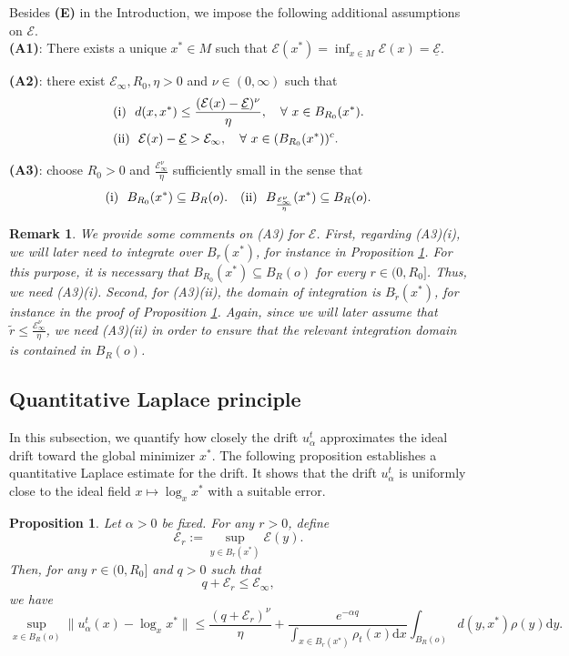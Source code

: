 \documentclass[11pt]{amsart}
\newtheorem{proposition}{Proposition}[section]
\newtheorem{remark}{Remark}[section]
\def\d{\mathrm{d}}
\newcommand{\supp}{\mathrm{supp}(\rho)}
\newcommand{\p}{o}%
\begin{document}
Besides \textbf{(E)} in the Introduction, we impose the following additional assumptions on $\mathcal{E}$.\\

\noindent\textbf{(A1)}: There exists a unique $x^*\in M$ such that $\mathcal E(x^*) = \inf_{x\in M} \mathcal E(x) =\underline{\mathcal E}$.


\noindent\textbf{(A2)}: there exist $\mathcal E_\infty, R_0,\eta>0$ and $\nu\in (0,\infty)$ such that
\begin{align*}
&\textup{(i)}~~d(x,x^*) \leq \frac{ (\mathcal E(x) - \underline{\mathcal E})^\nu}{\eta},\quad \forall~x\in B_{R_0}(x^*). \\
&\textup{(ii)}~~\mathcal E(x) -\underline{\mathcal E} >\mathcal E_\infty,\quad \forall~x\in (B_{R_0}(x^*))^c.
\end{align*} 

\noindent\textbf{(A3)}: choose $R_0>0$ and $\frac{ \mathcal E_\infty^\nu }{\eta}$ sufficiently small  in the sense that 
\[
\textup{(i)}~~B_{R_0}(x^*) \subseteq B_{R}(o). \quad \textup{(ii)}~~B_{\frac{ \mathcal E_\infty^\nu }{\eta}}(x^*) \subseteq B_{R}(o) .
\]
 

\begin{remark}
We provide some comments on (A3) for $\mathcal E$. First, regarding (A3)(i), we will later need to integrate over $B_r(x^*)$, for instance in Proposition \ref{prop: laplace}. For this purpose, it is necessary that $B_{R_0}(x^*)\subseteq B_R(o)$ for every $r\in (0,R_0]$. Thus, we need (A3)(i). Second,  for (A3)(ii), the domain of integration is $B_{\tilde r}(x^*)$, for instance in the proof of Proposition \ref{prop: laplace}. Again, since we will later assume that $\tilde r\leq \frac{ \mathcal E_\infty^\nu }{\eta} $, we need (A3)(ii) in order to ensure that the relevant integration domain is contained in $B_R(o)$.
\end{remark}

\subsection{Quantitative Laplace principle} 

In this subsection, we quantify how closely the drift $u_\alpha^t$ approximates the ideal drift toward the global minimizer $x^*$. The following proposition establishes a quantitative Laplace estimate for the drift. It shows that the drift $u_\alpha^t$ is uniformly close to the ideal field $x\mapsto \log_x x^*$ with a suitable error. 


\begin{proposition}\label{prop: laplace}
Let $\alpha>0$ be fixed. For any $r>0$, define
\[
\mathcal E_r := \sup_{y\in B_r(x^*)} \mathcal E(y).
\]
Then, for any $ r \in (0, R_0]$ and $q>0$ such that 
\[
q+\mathcal E_r\leq \mathcal E_\infty,
\]
we have
\[
\sup_{x\in B_R(\p)}\|u_\alpha^t(x) - \log_xx^*\| \leq \frac{(q+\mathcal E_r)^\nu}{\eta} + \frac{e^{-\alpha q}}{ \int_{x\in B_r(x^*)} \rho_t(x) \d x   }\int_{B_R(o)} d(y,x^*)\rho(y)\d y.
\]
\end{proposition}
\end{document}
